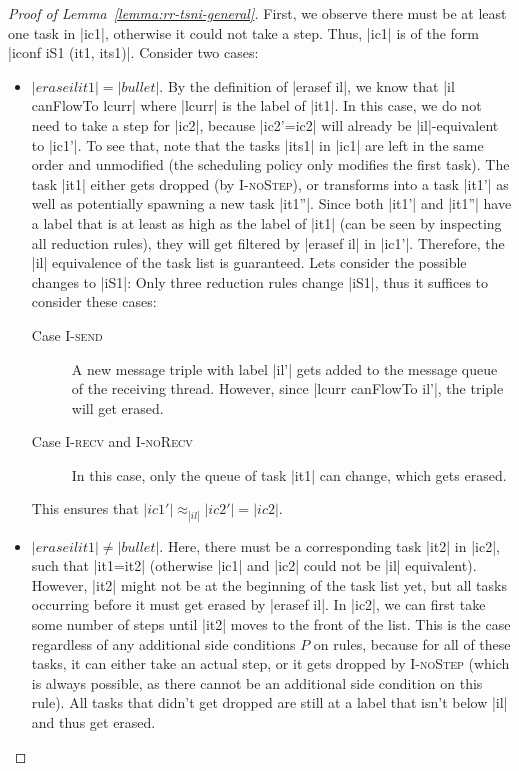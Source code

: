 \begin{proof}[Proof of Lemma~\ref{lemma:rr-tsni-general}]
  First, we observe there must be at least one task in |ic1|, otherwise
  it could not take a step.  Thus, |ic1| is of the form
  |iconf iS1 (it1, its1)|.  Consider two cases:
  \begin{itemize}
    \item $|erase il it1|=|bullet|$.
    By the definition of |erasef il|, we know that |il canFlowTo lcurr|
    where |lcurr| is the label of |it1|.
    In this case, we do not need to take a step for
    |ic2|, because |ic2'=ic2| will already be |il|-equivalent to |ic1'|.
    To see that, note that the tasks |its1| in |ic1| are left in the
    same order and unmodified (the scheduling policy only
    modifies the first task). The task |it1| either
    gets dropped (by \textsc{I-noStep}), or
    transforms into a task |it1'| as well as potentially spawning a new
    task |it1''|.  Since both |it1'| and |it1''| have a label that is
    at least as high as the label of |it1| (can be seen
    by inspecting all reduction rules), they will get filtered
    by |erasef il| in |ic1'|.  Therefore, the |il| equivalence of the
    task list is guaranteed.
    Lets consider the possible changes to |iS1|:
    Only three reduction rules change |iS1|,
    thus it suffices to consider these cases:
    \begin{description}
      \item[Case \textsc{I-send}]
      A new message triple with label |il'| gets added to the message
      queue of the receiving thread.  However, since |lcurr canFlowTo il'|,
      the triple will get erased.
      \item[Case \textsc{I-recv} and \textsc{I-noRecv}]
      In this case, only the queue of
      task |it1| can change, which gets erased.
    \end{description}
    This ensures that $|ic1'|\approx_{|il|}|ic2'|=|ic2|$.
    \item $|erase il it1|\neq|bullet|$.
    Here, there must be a corresponding
    task |it2| in |ic2|,
    such that |it1=it2| (otherwise |ic1| and
    |ic2| could not be |il| equivalent).
    However, |it2| might not be at the beginning of the task list yet, but
    all tasks occurring before it must get erased by |erasef il|.
    In |ic2|, we can first take some number of steps until |it2| moves
    to the front of the list.
    This is the case regardless of any additional side conditions $P$ on
    rules, because for all of these tasks, it can either take an actual
    step, or it gets dropped by \textsc{I-noStep} (which is always
    possible, as there cannot be an additional side condition on this
    rule).  All tasks that didn't get dropped are still at a label
    that isn't below |il| and thus get erased.
    

\end{itemize}
\end{proof}
